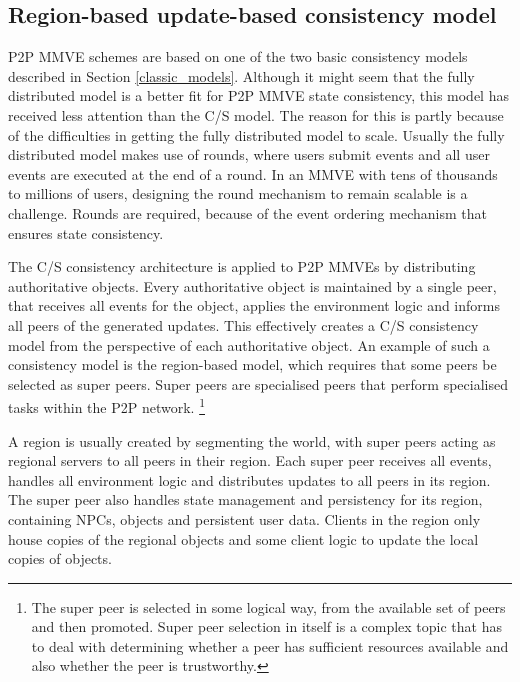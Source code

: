 
\subsection{Region-based update-based consistency model}
P2P MMVE schemes are based on one of the two basic consistency models described in Section \ref{classic_models}. Although it might seem that the fully distributed model is a better fit for P2P MMVE state consistency, this model has received less attention than the C/S model. The reason for this is partly because of the difficulties in getting the fully distributed model to scale. Usually the fully distributed model makes use of rounds, where users submit events and all user events are executed at the end of a round. In an MMVE with tens of thousands to millions of users, designing the round mechanism to remain scalable is a challenge. Rounds are required, because of the event ordering mechanism that ensures state consistency.

The C/S consistency architecture is applied to P2P MMVEs by distributing authoritative objects. Every authoritative object is maintained by a single peer, that receives all events for the object, applies the environment logic and informs all peers of the generated updates. This effectively creates a C/S consistency model from the perspective of each authoritative object. An example of such a consistency model is the region-based model, which requires that some peers be selected as super peers. Super peers are specialised peers that perform specialised tasks within the P2P network. \footnote{The super peer is selected in some logical way, from the available set of peers and then promoted. Super peer selection in itself is a complex topic that has to deal with determining whether a peer has sufficient resources available and also whether the peer is trustworthy.}

A region is usually created by segmenting the world, with super peers acting as regional servers to all peers in their region. Each super peer receives all events, handles all environment logic and distributes updates to all peers in its region. The super peer also handles state management and persistency for its region, containing NPCs, objects and persistent user data. Clients in the region only house copies of the regional objects and some client logic to update the local copies of objects.

